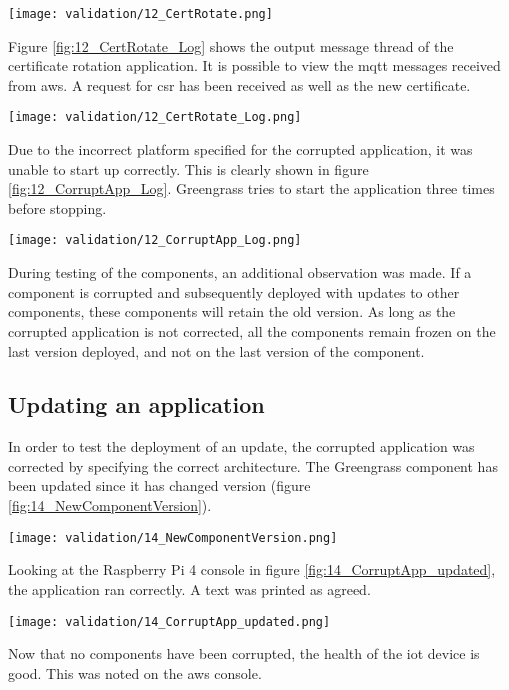 \begin{center}
    \begingroup
    \texttt{[image: validation/12\_CertRotate.png]}
    \label{fig:12_CertRotate}
    \endgroup
\end{center}
Figure \ref{fig:12_CertRotate_Log} shows the output message thread of the certificate rotation application. It is possible to view the \acrshort{mqtt} messages received from \gls{aws}. A request for \acrshort{csr} has been received as well as the new certificate.
\begin{center}
    \begingroup
    \texttt{[image: validation/12\_CertRotate\_Log.png]}
    \label{fig:12_CertRotate_Log}
    \endgroup
\end{center}
Due to the incorrect platform specified for the corrupted application, it was unable to start up correctly. This is clearly shown in figure \ref{fig:12_CorruptApp_Log}. Greengrass tries to start the application three times before stopping.
\begin{center}
    \begingroup
    \texttt{[image: validation/12\_CorruptApp\_Log.png]}
    \label{fig:12_CorruptApp_Log}
    \endgroup
\end{center}
During testing of the components, an additional observation was made. If a component is corrupted and subsequently deployed with updates to other components, these components will retain the old version. As long as the corrupted application is not corrected, all the components remain frozen on the last version deployed, and not on the last version of the component.

\subsection{Updating an application}
In order to test the deployment of an update, the corrupted application was corrected by specifying the correct architecture. The Greengrass component has been updated since it has changed version (figure \ref{fig:14_NewComponentVersion}).
\begin{center}
    \begingroup
    \texttt{[image: validation/14\_NewComponentVersion.png]}
    \label{fig:14_NewComponentVersion}
    \endgroup
\end{center}
Looking at the Raspberry Pi 4 console in figure \ref{fig:14_CorruptApp_updated}, the application ran correctly. A text was printed as agreed.
\begin{center}
    \begingroup
    \texttt{[image: validation/14\_CorruptApp\_updated.png]}
    \label{fig:14_CorruptApp_updated}
    \endgroup
\end{center}
Now that no components have been corrupted, the health of the \acrshort{iot} device is good. This was noted on the \gls{aws} console.

